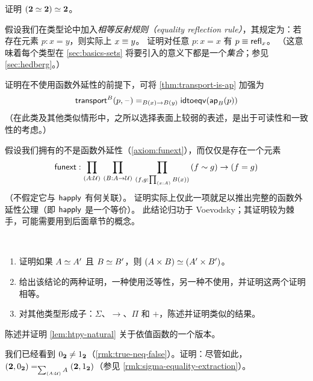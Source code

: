 \begin{ex}\label{ex:eqvboolbool}
  证明 $(\mathbf{2} \simeq \mathbf{2}) \simeq \mathbf{2}$。
\end{ex}

\begin{ex}\label{ex:equality-reflection}
  假设我们在类型论中加入\emph{相等反射规则（equality reflection rule）}，其规定为：若存在元素 $p:x=y$，则实际上 $x\equiv y$。
  证明对任意 $p:x=x$ 有 $p\equiv \mathsf{refl}_{x}$。
  （这意味着每个类型在 \cref{sec:basics-sets} 将要引入的意义下都是一个\emph{集合}；参见 \cref{sec:hedberg}。）
\end{ex}

\begin{ex}\label{ex:strengthen-transport-is-ap}
  证明在不使用函数外延性的前提下，可将 \cref{thm:transport-is-ap} 加强为
  \[\mathsf{transport}^{B}(p,{\mathord{\hspace{1pt}\text{--}\hspace{1pt}}}) =_{B(x)\to B(y)} \mathsf{idtoeqv}(\mathsf{ap}_{B}(p))\]
  （在此类及其他类似情形中，之所以选择表面上较弱的表述，是出于可读性和一致性的考虑。）
\end{ex}

\begin{ex}\label{ex:strong-from-weak-funext}
  假设我们拥有的不是函数外延性（\cref{axiom:funext}），而仅仅是存在一个元素
  \[ \funext : \prd{A:\UU}{B:A\to \UU}{f,g:\prd{x:A} B(x)} (f\htpy g) \to (f=g) \]
  （不假定它与 $\mathsf{happly}$ 有何关联）。
  证明实际上仅此一项就足以推出完整的函数外延性公理（即 $\mathsf{happly}$ 是一个等价）。
  此结论归功于 Voevodsky；其证明较为棘手，可能需要用到后面章节的概念。
\end{ex}

\begin{ex}\label{ex:equiv-functor-types}\
  \begin{enumerate}
  \item 证明如果 $A \simeq A'$ 且 $B \simeq B'$，则 $(A\times B) \simeq (A'\times B')$。
  \item 给出该结论的两种证明，一种使用泛等性，另一种不使用，并证明这两个证明相等。
  \item 对其他类型形成子：$\Sigma$、$\to$、$\Pi$ 和 $+$，陈述并证明类似的结果。
\end{enumerate}
\end{ex}

\begin{ex}\label{ex:dep-htpy-natural}
  陈述并证明 \cref{lem:htpy-natural} 关于依值函数的一个版本。
\end{ex}

\begin{ex}\label{ex:sigma-eq-components-neq}
  我们已经看到 ${0_{\mathbf{2}}} \neq {1_{\ensuremath{\mathbf{2}}}}$（\cref{rmk:true-neq-false}）。证明：尽管如此，$(\bool, \bfalse) =_{\sm{A:\type}A} (\bool, \btrue)$（参见 \cref{rmk:sigma-equality-extraction}）。
\end{ex}

